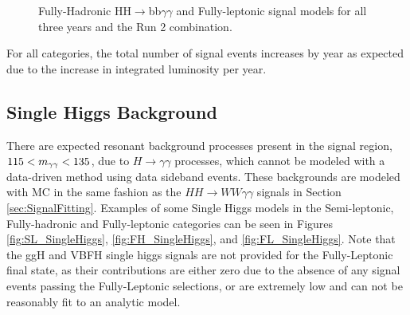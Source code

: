 \begin{figure}[!htbp]
    \setcounter{subfigure}{0}
    \centering
    \qquad
    \caption{Fully-Hadronic HH$\rightarrow$bb$\gamma\gamma$ and Fully-leptonic signal models for all three years and the Run 2 combination.}
\end{figure}

For all categories, the total number of signal events increases by year as expected due to the increase in integrated luminosity per year.

\clearpage
\subsection{Single Higgs Background}

There are expected resonant background processes present in the signal region, $115 < m_{\gamma\gamma} < 135$, due to $H\rightarrow\gamma\gamma$ processes, which cannot be modeled with a data-driven
method using data sideband events. These backgrounds are modeled with MC in the same fashion as the $HH\rightarrow WW\gamma\gamma$ signals in Section \ref{sec:SignalFitting}. Examples of some
Single Higgs models in the Semi-leptonic, Fully-hadronic and Fully-leptonic categories can
be seen in Figures \ref{fig:SL_SingleHiggs}, \ref{fig:FH_SingleHiggs}, and \ref{fig:FL_SingleHiggs}. Note that the ggH and VBFH single higgs signals are not provided for the Fully-Leptonic final state, as their contributions are either zero due to the absence of any
signal events passing the Fully-Leptonic selections, or are extremely low and can not be reasonably fit to an analytic model.

